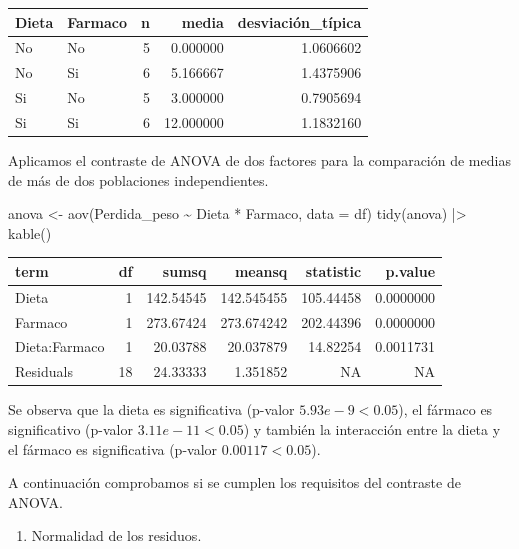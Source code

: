 \documentclass[
  a4paper,
]{scrreport}
\newenvironment{Shaded}{\begin{snugshade}}{\end{snugshade}}
\newcommand{\AttributeTok}[1]{\textcolor[rgb]{0.40,0.45,0.13}{#1}}
\newcommand{\FunctionTok}[1]{\textcolor[rgb]{0.28,0.35,0.67}{#1}}
\newcommand{\NormalTok}[1]{\textcolor[rgb]{0.00,0.23,0.31}{#1}}
\newcommand{\OtherTok}[1]{\textcolor[rgb]{0.00,0.23,0.31}{#1}}
\newcommand{\SpecialCharTok}[1]{\textcolor[rgb]{0.37,0.37,0.37}{#1}}
\theoremstyle{definition}
\theoremstyle{remark}
\begin{document}
\begin{tcolorbox}
\begin{longtable}[]{@{}llrrr@{}}
\toprule\noalign{}
Dieta & Farmaco & n & media & desviación\_típica \\
\midrule\noalign{}
\endhead
\bottomrule\noalign{}
\endlastfoot
No & No & 5 & 0.000000 & 1.0606602 \\
No & Si & 6 & 5.166667 & 1.4375906 \\
Si & No & 5 & 3.000000 & 0.7905694 \\
Si & Si & 6 & 12.000000 & 1.1832160 \\
\end{longtable}

Aplicamos el contraste de ANOVA de dos factores para la comparación de
medias de más de dos poblaciones independientes.

\begin{Shaded}
\begin{Highlighting}[]
\NormalTok{anova }\OtherTok{\textless{}{-}} \FunctionTok{aov}\NormalTok{(Perdida\_peso }\SpecialCharTok{\textasciitilde{}}\NormalTok{ Dieta }\SpecialCharTok{*}\NormalTok{ Farmaco, }\AttributeTok{data =}\NormalTok{ df)}
\FunctionTok{tidy}\NormalTok{(anova) }\SpecialCharTok{|\textgreater{}} 
    \FunctionTok{kable}\NormalTok{()}
\end{Highlighting}
\end{Shaded}

\begin{longtable}[]{@{}lrrrrr@{}}
\toprule\noalign{}
term & df & sumsq & meansq & statistic & p.value \\
\midrule\noalign{}
\endhead
\bottomrule\noalign{}
\endlastfoot
Dieta & 1 & 142.54545 & 142.545455 & 105.44458 & 0.0000000 \\
Farmaco & 1 & 273.67424 & 273.674242 & 202.44396 & 0.0000000 \\
Dieta:Farmaco & 1 & 20.03788 & 20.037879 & 14.82254 & 0.0011731 \\
Residuals & 18 & 24.33333 & 1.351852 & NA & NA \\
\end{longtable}

Se observa que la dieta es significativa (p-valor \(5.93e-9 < 0.05\)),
el fármaco es significativo (p-valor \(3.11e-11 < 0.05\)) y también la
interacción entre la dieta y el fármaco es significativa (p-valor
\(0.00117 < 0.05\)).

A continuación comprobamos si se cumplen los requisitos del contraste de
ANOVA.

\begin{enumerate}
\def\labelenumi{\alph{enumi}.}
\item
  Normalidad de los residuos.


\end{enumerate}
\end{tcolorbox}
\end{document}
